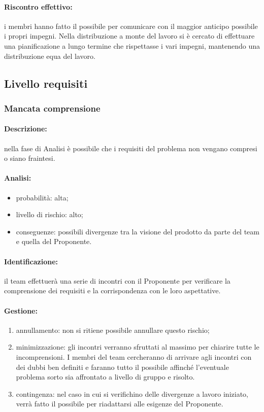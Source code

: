 \documentclass[../PianoProgetto.tex]{subfiles}
\begin{document}
	\paragraph*{Riscontro effettivo:} i membri hanno fatto il possibile per comunicare con il maggior anticipo possibile i propri impegni. Nella distribuzione a monte del lavoro si è cercato di effettuare una pianificazione a lungo termine che rispettasse i vari impegni, mantenendo una distribuzione equa del lavoro.


\subsection{Livello requisiti}

\subsubsection{Mancata comprensione}

	\paragraph*{Descrizione:} nella fase di Analisi è possibile che i requisiti del problema non vengano compresi o siano fraintesi.
	
	\paragraph*{Analisi:}
	\begin{itemize}
		\item probabilità: alta;
		\item livello di rischio: alto;
		\item conseguenze: possibili divergenze tra la visione del prodotto da parte del team e quella del Proponente.
	\end{itemize}	
		
	\paragraph*{Identificazione:} il team effettuerà una serie di incontri con il Proponente per verificare la comprensione dei requisiti e la corrispondenza con le loro aspettative.
	
	\paragraph*{Gestione:}
	\begin{enumerate}
		\item annullamento: non si ritiene possibile annullare questo rischio;
		\item minimizzazione: gli incontri verranno sfruttati al massimo per chiarire tutte le incomprensioni. I membri del team cercheranno di arrivare agli incontri con dei dubbi ben definiti e faranno tutto il possibile affinché l'eventuale problema sorto sia affrontato a livello di gruppo e risolto.
		\item contingenza: nel caso in cui si verifichino delle divergenze a lavoro iniziato, verrà fatto il possibile per riadattarsi alle esigenze del Proponente.
	\end{enumerate}	
	
\end{document}
